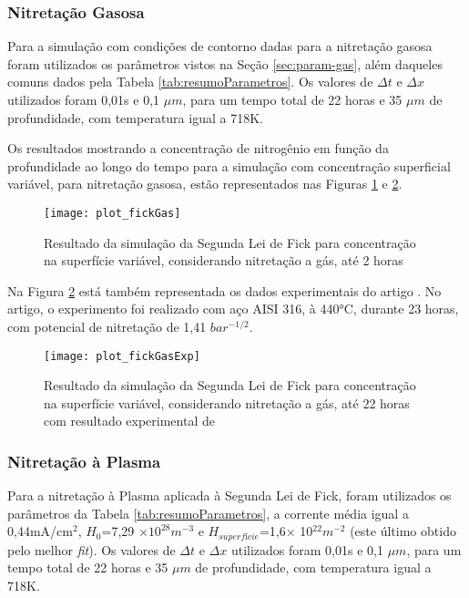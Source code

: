 \subsubsection{Nitretação Gasosa}
Para a simulação com condições de contorno dadas para a nitretação gasosa foram utilizados os parâmetros vistos na Seção \ref{sec:param-gas}, além daqueles comuns dados pela Tabela \ref{tab:resumoParametros}. Os valores de $\Delta t$ e $\Delta x$ utilizados foram 0,01s e 0,1 $\mu m$, para um tempo total de 22 horas e 35 $\mu m$ de profundidade, com temperatura igual a 718K.

Os resultados mostrando a concentração de nitrogênio em função da profundidade ao longo do tempo para a simulação com concentração superficial variável, para nitretação gasosa, estão representados nas Figuras \ref{fig:csvar-gas1} e \ref{fig:csvar-gas2}.

\begin{figure}[!htb]
\centering
	\caption{Resultado da simulação da Segunda Lei de Fick para concentração na superfície variável, considerando nitretação a gás, até 2 horas}
	\texttt{[image: plot\_fickGas]}
	\label{fig:csvar-gas1}
	\centering
\end{figure}

Na Figura \ref{fig:csvar-gas2} está também representada os dados experimentais do artigo \cite{christiansen2008nitrogen}. No artigo, o experimento foi realizado com aço AISI 316,  à 440°C, durante 23 horas, com potencial de nitretação de 1,41 $bar^{-1/2}$. 

\begin{figure}[!htb]
\centering
	\caption{Resultado da simulação da Segunda Lei de Fick para concentração na superfície variável, considerando nitretação a gás, até 22 horas com resultado experimental de \cite{christiansen2008nitrogen}}
	\texttt{[image: plot\_fickGasExp]}
	\label{fig:csvar-gas2}
	\centering
\end{figure}


\FloatBarrier


\subsubsection{Nitretação à Plasma}
Para a nitretação à Plasma aplicada à Segunda Lei de Fick, foram utilizados os parâmetros 
da Tabela \ref{tab:resumoParametros}, a corrente média igual a 0,44mA/cm$^2$, $H_0$=7,29 $\times 10^{28} m^{-3}$ e $H_{superfície}$=1,6$\times$ 10$^{22} m^{-2}$ (este último obtido pelo melhor \textit{fit}). Os valores de $\Delta t$ e $\Delta x$ utilizados foram 0,01s e 0,1 $\mu m$, para um tempo total de 22 horas e 35 $\mu m$ de profundidade, com temperatura igual a 718K.

